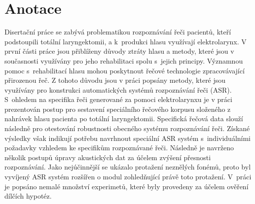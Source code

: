 \ifdefined\CELE
\else

\fi

\chapter*{Anotace}

Disertační práce se zabývá problematikou rozpoznávání řeči pacientů, kteří podstoupili totální laryngektomii, a  k~produkci hlasu využívají elektrolarynx. V první části práce jsou přiblíženy důvody ztráty hlasu a metody, které jsou v současnosti využívány pro jeho rehabilitaci spolu s~jejich principy. Významnou pomoc s~rehabilitací hlasu mohou poskytnout řečové technologie zpracovávající přirozenou řeč. Z tohoto důvodu jsou v práci popsány metody, které jsou využívány pro  konstrukci automatických systémů rozpoznávání řeči (ASR). S~ohledem na specifika řeči generované za pomoci elektrolarynxu je v práci prezentován postup pro sestavení speciálního řečového korpusu složeného z nahrávek hlasu pacienta po totální laryngektomii. Specifická řečová data slouží následně pro otestování robustnosti obecného systému rozpoznávání řeči. Získané výsledky však indikují potřebu navrhnout speciální ASR systém s~individuálními požadavky vzhledem ke specifikům rozpoznávané řeči. Následně je navrženo několik postupů úpravy akustických dat za účelem zvýšení přesnosti rozpoznávání. Jako nejúčinnější se ukázalo protažení neznělých fonémů, proto byl vyvíjený ASR systém rozšířen o modul zohledňující právě toto protažení. V~práci je popsáno nemalé množství experimetů, které byly provedeny za účelem ověření dílčích hypotéz.

\ifdefined\CELE
\else

\fi



